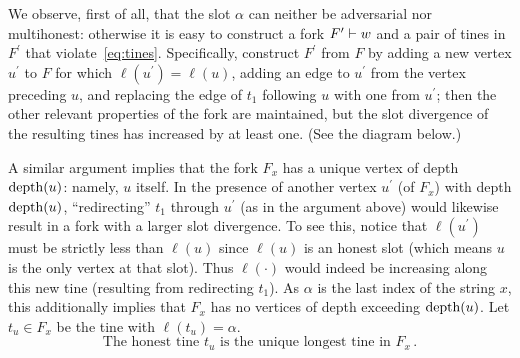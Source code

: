     We observe, first of all, that the slot $\alpha$ can neither be adversarial nor multihonest:
    otherwise it is easy to construct a fork
    $F^\prime \vdash w$ and a pair of tines in $F^\prime$ that violate~\eqref{eq:tines}. 
    Specifically, construct $F^\prime$ from $F$ by
    adding a new vertex $u^\prime$ to $F$ for which
    $\ell(u^\prime) = \ell(u)$, adding an edge to $u^\prime$ from the
    vertex preceding $u$, and replacing the edge of $t_1$ following $u$
    with one from $u^\prime$; then the other relevant properties of the
    fork are maintained, but the slot divergence of the resulting tines has
    increased by at least one. (See the diagram below.)
    \begin{center}
    \end{center}
    
    A similar argument implies that the fork
    $F_x$ has a unique vertex of depth $\operatorname{depth}(u)$: namely, $u$ itself. In
    the presence of another vertex $u^\prime$ (of $F_x$) with depth
    $\operatorname{depth}(u)$, ``redirecting'' $t_1$ through $u^\prime$ (as in the
    argument above) would likewise result in a fork with 
    a larger slot divergence. 
    To see this, notice that $\ell(u^\prime)$ must be strictly less than $\ell(u)$ 
    since $\ell(u)$ is an honest slot (which means $u$ is the only vertex at that slot).
    Thus $\ell(\cdot)$ would indeed be increasing along
    this new tine (resulting from redirecting $t_1$).
    As $\alpha$ is the last index of the string $x$, this additionally
    implies that $F_x$ has no vertices of depth exceeding $\operatorname{depth}(u)$. 
    Let $t_u \in F_x$ be the tine with $\ell(t_u) = \alpha$. 
    \begin{equation}\label{eq:tu}
        \text{The honest tine $t_u$ is the unique longest tine in $F_x$}
        \,.
    \end{equation}
    


